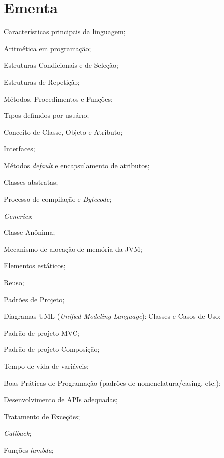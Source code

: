 \documentclass{article}
\begin{document}
\section{Ementa}
\begin{itemize*}[label={}]
    \item Características principais da linguagem;
    \item Aritmética em programação;
    \item Estruturas Condicionais e de Seleção;
    \item Estruturas de Repetição;
    \item Métodos, Procedimentos e Funções;

    \item Tipos definidos por usuário;
    \item Conceito de Classe, Objeto e Atributo;
    \item Interfaces;
    \item Métodos \textit{default} e encapsulamento de atributos;
    \item Classes abstratas;

    \item Processo de compilação e \textit{Bytecode};
    \item \textit{Generics};
    \item Classe Anônima;
    \item Mecanismo de alocação de memória da JVM\@;
    \item Elementos estáticos;

    \item Reuso;
    \item Padrões de Projeto;
    \item Diagramas UML (\textit{Unified Modeling Language}): Classes
        e Casos de Uso;
    \item Padrão de projeto MVC\@;
    \item Padrão de projeto Composição;

    \item Tempo de vida de variáveis;
    \item Boas Práticas de Programação (padrões de nomenclatura/casing, etc.);
    \item Desenvolvimento de APIs adequadas;
    \item Tratamento de Exceções;
    \item \textit{Callback};
    \item Funções \textit{lambda};


\end{itemize*}
\end{document}
